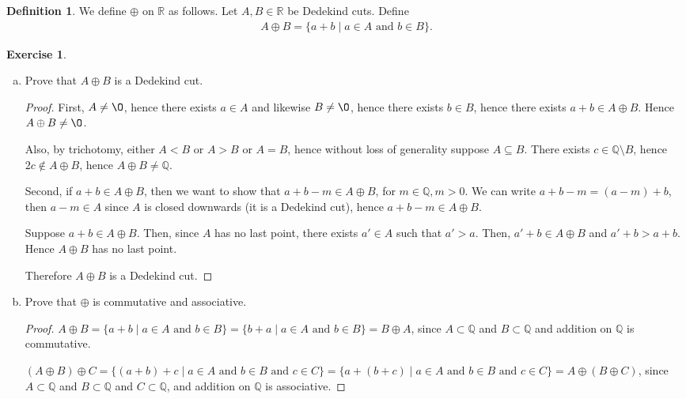 \documentclass[11pt]{article}
\newcommand{\bbQ}{\mathbb{Q}}
\newcommand{\bbR}{\mathbb{R}}
\renewcommand{\emptyset}{\O}
\theoremstyle{definition}
\newtheorem{definition}[theorem]{Definition}
\newtheorem{exercise}[theorem]{Exercise}
\numberwithin{equation}{subsection}
\begin{document}
\begin{definition}
	We define $\oplus $ on $\bbR$ as follows. Let $A,B\in\bbR$ be Dedekind cuts. Define
	\begin{align*}
		A \oplus B = \{a + b \mid a \in A\text{ and }b \in B\}.
	\end{align*}
\end{definition}

\begin{exercise}
	\begin{enumerate}[(a)]
		\item Prove that $A \oplus B$ is a Dedekind cut.        
\begin{proof}
First, $A \neq \emptyset$, hence there exists $a \in A$ and likewise $B \neq \emptyset$, hence there exists $b \in B$, hence there exists $a+b \in A \oplus B$. Hence $A \oplus B \neq \emptyset$. 

Also, by trichotomy, either $A<B$ or $A>B$ or $A=B$, hence without loss of generality suppose $A \subseteq B$. There exists $c \in \bbQ \setminus B$, hence $2c \notin A \oplus B$, hence $A \oplus B \neq \bbQ$.

Second, if $a+b \in A \oplus B$, then we want to show that $a+b-m \in A \oplus B$, for $m \in \bbQ, m>0$. We can write $a+b-m=(a-m)+b$, then $a-m \in A$ since $A$ is closed downwards (it is a Dedekind cut), hence $a+b-m \in A \oplus B$.

Suppose $a+b \in A \oplus B$. Then, since $A$ has no last point, there exists $a' \in A$ such that $a'>a$. Then, $a'+b \in A \oplus B$ and $a'+b>a+b$. Hence $A \oplus B$ has no last point.

Therefore $A \oplus B$ is a Dedekind cut.


\renewcommand\qedsymbol{QED}
\end{proof}

		\item Prove that $\oplus$ is commutative and associative. 

\begin{proof}
$A \oplus B = \{a + b \mid a \in A\text{ and }b \in B\} = \{b + a \mid a \in A\text{ and }b \in B\} = B \oplus A$, since $A \subset \bbQ$ and $B \subset \bbQ$ and addition on $\bbQ$ is commutative.

$(A \oplus B)\oplus C = \{(a + b)+c \mid a \in A\text{ and }b \in B \text{ and }c \in C\} = \{a + (b+c) \mid a \in A\text{ and }b \in B \text{ and }c \in C\} = A \oplus (B \oplus C)$, since $A \subset \bbQ$ and $B \subset \bbQ$ and $C \subset \bbQ$, and addition on $\bbQ$ is associative.


\end{proof}
\end{enumerate}
\end{exercise}
\end{document}

